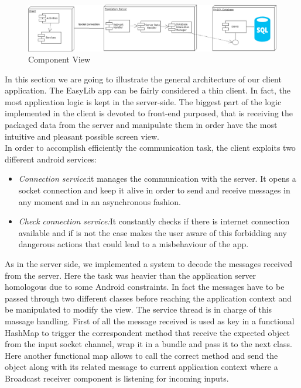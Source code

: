 \vspace*{0cm}
\begin{figure}[H]
	\centering
	\includegraphics[scale=0.35]{Images/Diagrams/Component_diagram}
	\caption{Component View}
\end{figure}

In this section we are going to illustrate the general architecture of our client application. The EasyLib app can be fairly considered a thin client. In fact, the most application logic is kept in the server-side. The biggest part of the logic implemented in the client is devoted to front-end purposed, that is receiving the packaged data from the server and manipulate them in order have the most intuitive and pleasant possible screen view.\\ 
In order to accomplish efficiently the communication task, the client exploits two different android services: 

\begin{itemize}
\item \emph{Connection service:}it manages the communication with the server. It opens a socket connection and keep it alive in order to send and receive messages in any moment and in an asynchronous fashion.
\item \emph{Check connection service:}It constantly checks if there is internet connection available and if is not the case makes the user aware of this forbidding any dangerous actions that could lead to a misbehaviour of the app.
\end{itemize}

As in the server side, we implemented a system to decode the messages received from the server. Here the task was heavier than the application server homologous due to some Android constraints. In fact the messages have to be passed through two different classes before reaching the application context and be manipulated to modify the view. The service thread is in charge of this massage handling. First of all the message received is used as key in a functional HashMap to trigger the correspondent method that receive the expected object from the input socket channel, wrap it in a bundle and pass it to the next class. Here another functional map allows to call the correct method and send the object along with its related message to current application context where a Broadcast receiver component is listening for incoming inputs.


